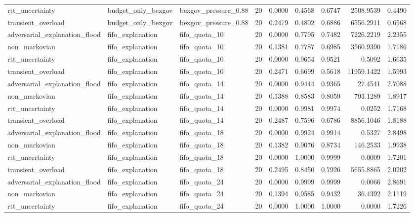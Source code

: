 \begin{table}[t]
\begin{tabular}{lllrrrrrr}
rtt\_uncertainty & budget\_only\_bexgov & bexgov\_pressure\_0.88 & 20 & 0.0000 & 0.4568 & 0.6747 & 2508.9539 & 0.4490 \\
transient\_overload & budget\_only\_bexgov & bexgov\_pressure\_0.88 & 20 & 0.2479 & 0.4802 & 0.6886 & 6556.2911 & 0.6568 \\
adversarial\_explanation\_flood & fifo\_explanation & fifo\_quota\_10 & 20 & 0.0000 & 0.7795 & 0.7482 & 7226.2219 & 2.2355 \\
non\_markovian & fifo\_explanation & fifo\_quota\_10 & 20 & 0.1381 & 0.7787 & 0.6985 & 3560.9390 & 1.7186 \\
rtt\_uncertainty & fifo\_explanation & fifo\_quota\_10 & 20 & 0.0000 & 0.9654 & 0.9521 & 0.5092 & 1.6635 \\
transient\_overload & fifo\_explanation & fifo\_quota\_10 & 20 & 0.2471 & 0.6699 & 0.5618 & 11959.1422 & 1.5993 \\
adversarial\_explanation\_flood & fifo\_explanation & fifo\_quota\_14 & 20 & 0.0000 & 0.9444 & 0.9365 & 27.4541 & 2.7088 \\
non\_markovian & fifo\_explanation & fifo\_quota\_14 & 20 & 0.1388 & 0.8583 & 0.8059 & 793.1289 & 1.8917 \\
rtt\_uncertainty & fifo\_explanation & fifo\_quota\_14 & 20 & 0.0000 & 0.9981 & 0.9974 & 0.0252 & 1.7168 \\
transient\_overload & fifo\_explanation & fifo\_quota\_14 & 20 & 0.2487 & 0.7596 & 0.6786 & 8856.1046 & 1.8188 \\
adversarial\_explanation\_flood & fifo\_explanation & fifo\_quota\_18 & 20 & 0.0000 & 0.9924 & 0.9914 & 0.5327 & 2.8498 \\
non\_markovian & fifo\_explanation & fifo\_quota\_18 & 20 & 0.1382 & 0.9076 & 0.8734 & 146.2533 & 1.9938 \\
rtt\_uncertainty & fifo\_explanation & fifo\_quota\_18 & 20 & 0.0000 & 1.0000 & 0.9999 & 0.0009 & 1.7201 \\
transient\_overload & fifo\_explanation & fifo\_quota\_18 & 20 & 0.2495 & 0.8450 & 0.7926 & 5655.8865 & 2.0202 \\
adversarial\_explanation\_flood & fifo\_explanation & fifo\_quota\_24 & 20 & 0.0000 & 0.9999 & 0.9999 & 0.0066 & 2.8691 \\
non\_markovian & fifo\_explanation & fifo\_quota\_24 & 20 & 0.1394 & 0.9585 & 0.9432 & 36.4392 & 2.1119 \\
rtt\_uncertainty & fifo\_explanation & fifo\_quota\_24 & 20 & 0.0000 & 1.0000 & 1.0000 & 0.0000 & 1.7226 \\

\end{tabular}
\end{table}
